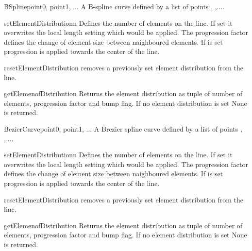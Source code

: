 \begin{classdesc}{BSpline}{point0, point1, ...}
A B-spline curve defined by a list of points , ,....
\end{classdesc}
\begin{methoddesc}[BSpline]{setElementDistribution}{n}
Defines the number of elements on the line. If set it overwrites the local length setting which would be applied. The progression factor  defines the change of element size between naighboured elements. If  is set
progression is applied towards the center of the line.
\end{methoddesc}
\begin{methoddesc}[BSpline]{resetElementDistribution}{}
removes a previously set element distribution from the line.
\end{methoddesc}
\begin{methoddesc}[BSpline]{getElemenofDistribution}{}
Returns the element distribution as tuple of
number of elements, progression factor and bump flag. If
no element distribution is set None is returned.
\end{methoddesc}

\begin{classdesc}{BezierCurve}{point0, point1, ...}
A Brezier spline curve defined by a list of points , ,....
\end{classdesc}
\begin{methoddesc}[BezierCurve]{setElementDistribution}{n}
Defines the number of elements on the line. If set it overwrites the local length setting which would be applied. The progression factor  defines the change of element size between naighboured elements. If  is set
progression is applied towards the center of the line.
\end{methoddesc}
\begin{methoddesc}[BezierCurve]{resetElementDistribution}{}
removes a previously set element distribution from the line.
\end{methoddesc}
\begin{methoddesc}[BezierCurve]{getElemenofDistribution}{}
Returns the element distribution as tuple of
number of elements, progression factor and bump flag. If
no element distribution is set None is returned.
\end{methoddesc}

